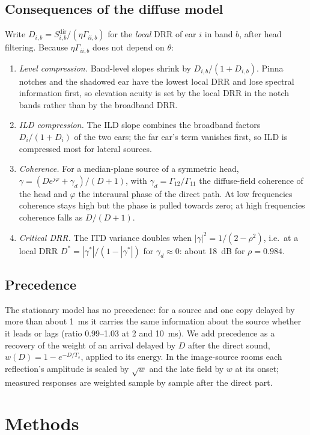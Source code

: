\documentclass[11pt]{article}
\begin{document}
\subsection{Consequences of the diffuse model}
Write $D_{i,b}=S^{\mathrm{dir}}_{i,b}/(\eta\Gamma_{ii,b})$ for the \emph{local} DRR of ear $i$ in band $b$, after head filtering. Because $\eta\Gamma_{ii,b}$ does not depend on $\theta$:
\begin{enumerate}
\item \emph{Level compression.} Band-level slopes shrink by $D_{i,b}/(1+D_{i,b})$. Pinna notches and the shadowed ear have the lowest local DRR and lose spectral information first, so elevation acuity is set by the local DRR in the notch bands rather than by the broadband DRR.
\item \emph{ILD compression.} The ILD slope combines the broadband factors $D_i/(1+D_i)$ of the two ears; the far ear's term vanishes first, so ILD is compressed most for lateral sources.
\item \emph{Coherence.} For a median-plane source of a symmetric head, $\gamma=(De^{j\varphi}+\gamma_d)/(D+1)$, with $\gamma_d=\Gamma_{12}/\Gamma_{11}$ the diffuse-field coherence of the head and $\varphi$ the interaural phase of the direct path. At low frequencies coherence stays high but the phase is pulled towards zero; at high frequencies coherence falls as $D/(D+1)$.
\item \emph{Critical DRR.} The ITD variance doubles when $|\gamma|^2=1/(2-\rho^2)$, i.e.\ at a local DRR $D^{*}=|\gamma^{*}|/(1-|\gamma^{*}|)$ for $\gamma_d\approx0$: about 18~dB for $\rho=0.984$.
\end{enumerate}

\subsection{Precedence}
The stationary model has no precedence: for a source and one copy delayed by more than about 1~ms it carries the same information about the source whether it leads or lags (ratio 0.99--1.03 at 2 and 10~ms). We add precedence as a recovery of the weight of an arrival delayed by $D$ after the direct sound, $w(D)=1-e^{-D/T_s}$, applied to its energy. In the image-source rooms each reflection's amplitude is scaled by $\sqrt{w}$ and the late field by $w$ at its onset; measured responses are weighted sample by sample after the direct part.

\section{Methods}\label{sec:methods}
\end{document}
